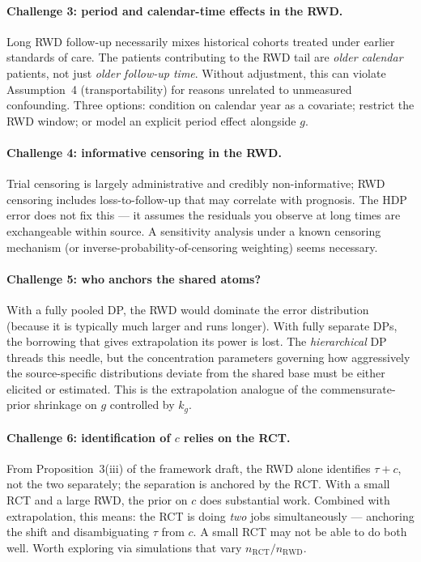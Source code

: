 \documentclass[11pt]{article}
\theoremstyle{plain}
\theoremstyle{definition}
\theoremstyle{remark}
\newcommand{\1}{\mathds{1}}
\newcommand{\tauf}{\tau}
\newcommand{\cf}{c}
\newcommand{\gf}{g}
\newcommand{\RCT}{\mathrm{RCT}}
\newcommand{\RWD}{\mathrm{RWD}}
\begin{document}
\paragraph{Challenge 3: period and calendar-time effects in the RWD.}
Long RWD follow-up necessarily mixes historical cohorts treated under earlier
standards of care. The patients contributing to the RWD tail are
\emph{older calendar} patients, not just \emph{older follow-up time}.
Without adjustment, this can violate Assumption~4 (transportability) for
reasons unrelated to unmeasured confounding. Three options:
condition on calendar year as a covariate; restrict the RWD window;
or model an explicit period effect alongside $\gf$.

\paragraph{Challenge 4: informative censoring in the RWD.}
Trial censoring is largely administrative and credibly non-informative;
RWD censoring includes loss-to-follow-up that may correlate with
prognosis. The HDP error does not fix this --- it assumes the residuals you
observe at long times are exchangeable within source. A sensitivity analysis
under a known censoring mechanism (or inverse-probability-of-censoring
weighting) seems necessary.

\paragraph{Challenge 5: who anchors the shared atoms?}
With a fully pooled DP, the RWD would dominate the error distribution
(because it is typically much larger and runs longer). With fully separate
DPs, the borrowing that gives extrapolation its power is lost. The
\emph{hierarchical} DP threads this needle, but the concentration parameters
governing how aggressively the source-specific distributions deviate from
the shared base must be either elicited or estimated. This is the
extrapolation analogue of the commensurate-prior shrinkage on $\gf$
controlled by $k_g$.

\paragraph{Challenge 6: identification of $\cf$ relies on the RCT.}
From Proposition~3(iii) of the framework draft, the RWD alone identifies
$\tauf + \cf$, not the two separately; the separation is anchored by the
RCT. With a small RCT and a large RWD, the prior on $\cf$ does substantial
work. Combined with extrapolation, this means: the RCT is doing
\emph{two} jobs simultaneously --- anchoring the shift and disambiguating
$\tauf$ from $\cf$. A small RCT may not be able to do both well. Worth
exploring via simulations that vary $n_{\RCT}/n_{\RWD}$.
\end{document}
